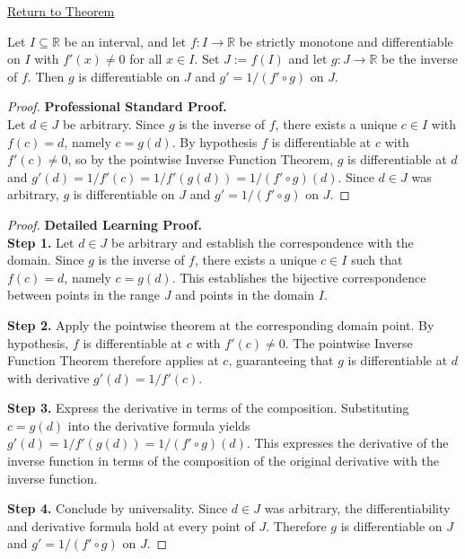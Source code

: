 \newpage
{}
\label{prf:derivative-inverse-function-on-interval}

\begin{remark*}[Return]
\hyperref[thm:inverse-function-theorem-global]{Return to Theorem}
\end{remark*}

\begin{theorem*}
Let $I \subseteq \mathbb{R}$ be an interval, and let $f : I \to \mathbb{R}$ be strictly monotone and differentiable on $I$ with $f'(x) \neq 0$ for all $x \in I$. Set $J := f(I)$ and let $g : J \to \mathbb{R}$ be the inverse of $f$. Then $g$ is differentiable on $J$ and $g' = 1/(f' \circ g)$ on $J$.
\end{theorem*}

\begin{proof}
\textbf{Professional Standard Proof.}~\\
Let $d \in J$ be arbitrary. Since $g$ is the inverse of $f$, there exists a unique $c \in I$ with $f(c) = d$, namely $c = g(d)$. By hypothesis $f$ is differentiable at $c$ with $f'(c) \neq 0$, so by the pointwise Inverse Function Theorem, $g$ is differentiable at $d$ and $g'(d) = 1/f'(c) = 1/f'(g(d)) = 1/(f' \circ g)(d)$. Since $d \in J$ was arbitrary, $g$ is differentiable on $J$ and $g' = 1/(f' \circ g)$ on $J$.
\end{proof}

\begin{proof}
\textbf{Detailed Learning Proof.}~\\

\textbf{Step 1.} Let $d \in J$ be arbitrary and establish the correspondence with the domain. Since $g$ is the inverse of $f$, there exists a unique $c \in I$ such that $f(c) = d$, namely $c = g(d)$. This establishes the bijective correspondence between points in the range $J$ and points in the domain $I$.

\textbf{Step 2.} Apply the pointwise theorem at the corresponding domain point. By hypothesis, $f$ is differentiable at $c$ with $f'(c) \neq 0$. The pointwise Inverse Function Theorem therefore applies at $c$, guaranteeing that $g$ is differentiable at $d$ with derivative $g'(d) = 1/f'(c)$.

\textbf{Step 3.} Express the derivative in terms of the composition. Substituting $c = g(d)$ into the derivative formula yields $g'(d) = 1/f'(g(d)) = 1/(f' \circ g)(d)$. This expresses the derivative of the inverse function in terms of the composition of the original derivative with the inverse function.

\textbf{Step 4.} Conclude by universality. Since $d \in J$ was arbitrary, the differentiability and derivative formula hold at every point of $J$. Therefore $g$ is differentiable on $J$ and $g' = 1/(f' \circ g)$ on $J$.
\end{proof}

